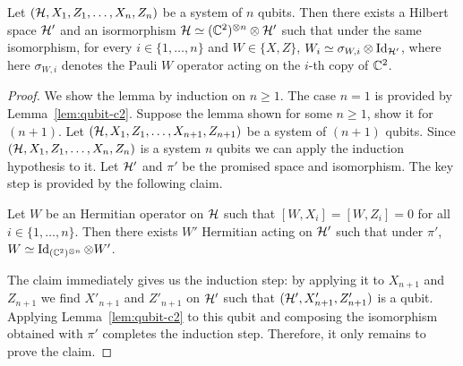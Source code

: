 \begin{lemma}\label{lem:n-qubit-c2}
Let $(\mathcal{H},X_1,Z_1,\ldots,X_n,Z_n)$ be a system of $n$ qubits. Then there exists a Hilbert space $\mathcal{H}'$ and an isormorphism $\mathcal{H}\simeq (\mathbb{C}^2)^{\otimes n} \otimes \mathcal{H}'$ such that under the same isomorphism, for every $i\in \{1,\ldots, n\}$ and $W\in \{X,Z\}$, $W_i \simeq \sigma_{W,i} \otimes \mathop{\rm Id}\nolimits_{\mathcal{H}'}$, where here $\sigma_{W,i}$ denotes the Pauli $W$ operator acting on the $i$-th copy of $\mathbb{C}^2$. 
\end{lemma} 

\begin{proof}
We show the lemma by induction on $n\geq 1$. The case $n=1$ is provided by Lemma~\ref{lem:qubit-c2}. Suppose the lemma shown for some $n\geq 1$, show it for $(n+1)$. Let $(\mathcal{H},X_1,Z_1,\ldots,X_{n+1},Z_{n+1})$ be a system of $(n+1)$ qubits. Since $(\mathcal{H},X_1,Z_1,\ldots,X_n,Z_n)$ is a system $n$ qubits we can apply the induction hypothesis to it. Let $\mathcal{H}'$ and $\pi'$ be the promised space and isomorphism. The key step is provided by the following claim.

\begin{claim}\label{claim:n-qubit-c2}
Let $W$ be an Hermitian operator on $\mathcal{H}$ such that $[W,X_i]=[W,Z_i]=0$ for all $i\in \{1,\ldots,n\}$. Then there exists $W'$ Hermitian acting on $\mathcal{H}'$ such that under $\pi'$, $W\simeq \mathop{\rm Id}\nolimits_{(\mathbb{C}^2)^{\otimes n}} \otimes W'$. 
\end{claim}

The claim immediately gives us the induction step: by applying it to $X_{n+1}$ and $Z_{n+1}$ we find $X'_{n+1}$ and $Z'_{n+1}$ on $\mathcal{H}'$ such that $(\mathcal{H}',X'_{n+1},Z'_{n+1})$ is a qubit. Applying Lemma~\ref{lem:qubit-c2} to this qubit  and composing the isomorphism obtained with $\pi'$ completes the induction step. Therefore, it only remains to prove the claim. 


\end{proof}

